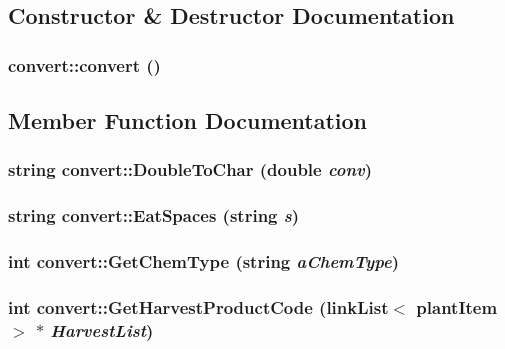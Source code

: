 \subsection{Constructor \& Destructor Documentation}
\hypertarget{classconvert_a20aaf90e85ae0b32c0f8022d90d797eb}{
\subsubsection[{convert}]{\setlength{\rightskip}{0pt plus 5cm}convert::convert ()}}
\label{classconvert_a20aaf90e85ae0b32c0f8022d90d797eb}


\subsection{Member Function Documentation}
\hypertarget{classconvert_aacc8f3cb1e7a2a82a125f819968cad40}{
\subsubsection[{DoubleToChar}]{\setlength{\rightskip}{0pt plus 5cm}string convert::DoubleToChar (double {\em conv})}}
\label{classconvert_aacc8f3cb1e7a2a82a125f819968cad40}
\hypertarget{classconvert_aa6f91ed1b82ad81d914117320c9d5428}{
\subsubsection[{EatSpaces}]{\setlength{\rightskip}{0pt plus 5cm}string convert::EatSpaces (string {\em s})}}
\label{classconvert_aa6f91ed1b82ad81d914117320c9d5428}
\hypertarget{classconvert_a66b4128c2191873240954813691f8406}{
\subsubsection[{GetChemType}]{\setlength{\rightskip}{0pt plus 5cm}int convert::GetChemType (string {\em aChemType})}}
\label{classconvert_a66b4128c2191873240954813691f8406}
\hypertarget{classconvert_a6acbe29be64d48889f62d442e2aa62f2}{
\subsubsection[{GetHarvestProductCode}]{\setlength{\rightskip}{0pt plus 5cm}int convert::GetHarvestProductCode ({\bf linkList}$<$ {\bf plantItem} $>$ $\ast$ {\em HarvestList})}}
